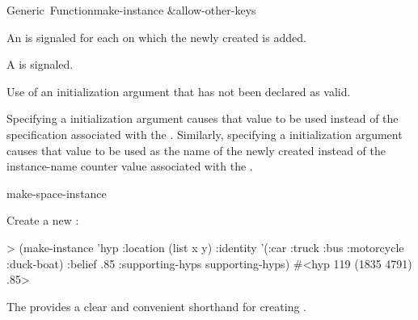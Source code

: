 \documentclass[10pt,twoside,english,pdftex]{article}
\begin{document}
\begin{functiondoc}{Generic~Function}{make-instance}{
     
     \&allow-other-keys \returns{} }
\begin{tightenumerate}
\item An  is signaled
  for each  on which the newly created
   is added.

\item A  is signaled.

\end{tightenumerate}

\fnerrors
Use of an initialization argument that has not been declared as valid.

%
%
%
\fndescription Specifying a  initialization argument
causes that value to be used instead of the 
specification associated with the . Similarly, specifying a
 initialization argument causes that value to be used as
the name of the newly created  instead of the
instance-name counter value associated with the .

\begin{alsos}{make-space-instance}
\end{alsos}

\fnexample
Create a new  :
\begin{example}
> (make-instance 'hyp 
     :location (list x y)
     :identity '(:car :truck :bus :motorcycle :duck-boat)
     :belief .85
     :supporting-hyps supporting-hyps)
#<hyp 119 (1835 4791) .85>
\end{example}

\fnnote 
{}%
The  \textbf{} provides a
clear and convenient shorthand for creating .

\end{functiondoc}

\end{document}
